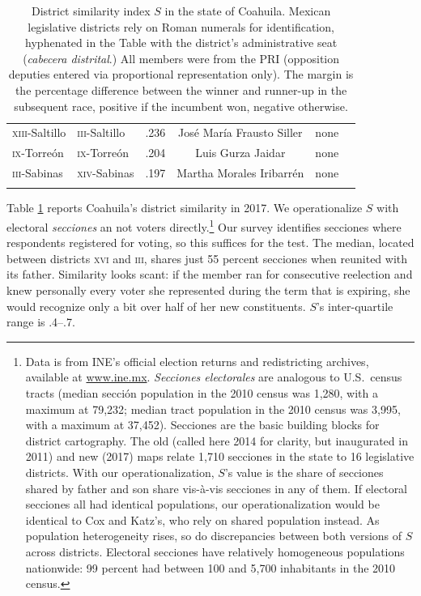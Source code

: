\documentclass[letter,12pt]{article}
\begin{document}
\begin{table}
{\begin{tabular}{llrccc}
 \textsc{xiii}-Saltillo     & \textsc{iii}-Saltillo       &  .236 & José María Frausto Siller   & none            & \\ 
 \textsc{ix}-Torreón        & \textsc{ix}-Torreón         &  .204 & Luis Gurza Jaidar           & none            & \\ 
 \textsc{iii}-Sabinas       & \textsc{xiv}-Sabinas        &  .197 & Martha Morales Iribarrén    & none            & \\ 
 \\ [-1.2ex] \hline
\end{tabular}
}
\caption{District similarity index $S$ in the state of Coahuila. Mexican legislative districts rely on Roman numerals for identification, hyphenated in the Table with the district's administrative seat (\emph{cabecera distrital}.) All members were from the PRI (opposition deputies entered via proportional representation only). The margin is the percentage difference between the winner and runner-up in the subsequent race, positive if the incumbent won, negative otherwise.}\label{T:dsi}
\end{table}

Table \ref{T:dsi} reports Coahuila's district similarity in 2017. We operationalize $S$ with electoral \emph{secciones} an not voters directly.\footnote{Data is from INE's official election returns and redistricting archives, available at \url{www.ine.mx}. \emph{Secciones electorales} are analogous to U.S.\ census tracts (median sección population in the 2010 census was 1,280, with a maximum at 79,232; median tract population in the 2010 census was 3,995, with a maximum at 37,452). Secciones are the basic building blocks for district cartography. The old (called here 2014 for clarity, but inaugurated in 2011) and new (2017) maps relate 1,710 secciones in the state to 16 legislative districts. With our operationalization, $S$'s value is the share of secciones shared by father and son share vis-à-vis secciones in any of them. If electoral secciones all had identical populations, our operationalization would be identical to Cox and Katz's, who rely on shared population instead. As population heterogeneity rises, so do discrepancies between both versions of $S$ across districts. Electoral secciones have relatively homogeneous populations nationwide: 99 percent had between 100 and 5,700 inhabitants in the 2010 census.} Our survey identifies secciones where respondents registered for voting, so this suffices for the test. The median, located between districts \textsc{xvi} and \textsc{iii}, shares just 55 percent secciones when reunited with its father. Similarity looks scant: if the member ran for consecutive reelection and knew personally every voter she represented during the term that is expiring, she would recognize only a bit over half of her new constituents. $S$'s inter-quartile range is .4--.7.
\end{document}
